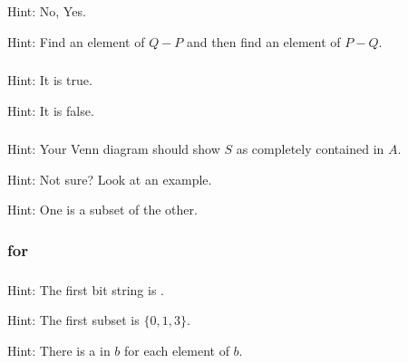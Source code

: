 \subsubsection*{ \answers}
\begin{apart}
    \item Hint: No, Yes.
    \item Hint: Find an element of $Q -P$ and then find an element of $P-Q$.
\end{apart}

\subsubsection*{ \answers}
\begin{apart}
    \item Hint: It is true.
    \item Hint: It is false.
\end{apart}

\subsubsection*{ \answers}
\begin{apart}
    \item Hint: Your Venn diagram should show $S$ as completely contained in $A$.
    \item Hint: Not sure?  Look at an example.
    \item Hint: One is a subset of the other.
\end{apart}

\subsubsection{\answers for 
\subbsrepsubset}

\subsubsection*{ \answers}
\begin{apart}
    \item Hint: The first bit string is .
    \item Hint: The first subset is $\{0,1,3\}$.
    \item Hint: There is a  in $b$ for each element of $b$.
\end{apart}

